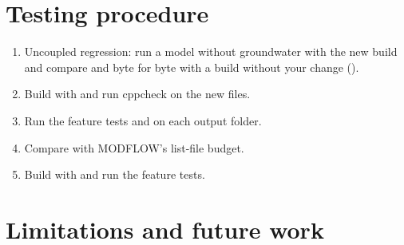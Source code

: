 \section{Testing procedure}
\begin{enumerate}
\item Uncoupled regression: run a model without groundwater with the new build and compare  and
 byte for byte with a build without your change ().
\item Build with  and run cppcheck on the new files.
\item Run the feature tests and  on each output folder.
\item Compare with MODFLOW's list-file budget.
\item Build with  and run the feature tests.
\end{enumerate}

\section{Limitations and future work}\label{ch:limits}
